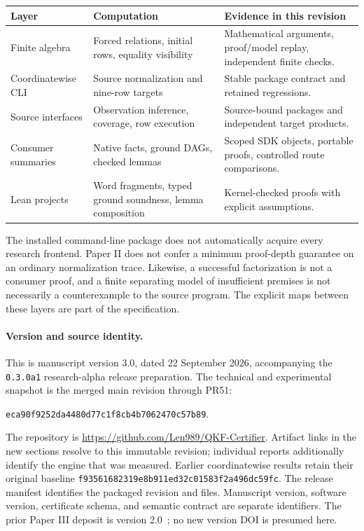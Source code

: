 \begin{center}\small
\begin{tabularx}{\textwidth}{@{}l>{\raggedright\arraybackslash}X>{\raggedright\arraybackslash}X@{}}
\toprule
Layer & Computation & Evidence in this revision\\
\midrule
Finite algebra & Forced relations, initial rows, equality visibility & Mathematical arguments, proof/model replay, independent finite checks.\\
Coordinatewise CLI & Source normalization and nine-row targets & Stable package contract and retained regressions.\\
Source interfaces & Observation inference, coverage, row execution & Source-bound packages and independent target products.\\
Consumer summaries & Native facts, ground DAGs, checked lemmas & Scoped SDK objects, portable proofs, controlled route comparisons.\\
Lean projects & Word fragments, typed ground soundness, lemma composition & Kernel-checked proofs with explicit assumptions.\\
\bottomrule
\end{tabularx}
\end{center}

The installed command-line package does not automatically acquire every research frontend. Paper II does not confer a minimum proof-depth guarantee on an ordinary normalization trace. Likewise, a successful factorization is not a consumer proof, and a finite separating model of insufficient premises is not necessarily a counterexample to the source program. The explicit maps between these layers are part of the specification.

\paragraph{Version and source identity.}
This is manuscript version 3.0, dated 22 September 2026, accompanying the \texttt{0.3.0a1} research-alpha release preparation. The technical and experimental snapshot is the merged main revision through PR51:
\begin{center}\small\texttt{eca90f9252da4480d77c1f8cb4b7062470c57b89}.\end{center}
The repository is \url{https://github.com/Len989/QKF-Certifier}. Artifact links in the new sections resolve to this immutable revision; individual reports additionally identify the engine that was measured. Earlier coordinatewise results retain their original baseline \texttt{f93561682319e8b911ed32c01583f2a496dc59fc}. The release manifest identifies the packaged revision and files. Manuscript version, software version, certificate schema, and semantic contract are separate identifiers. The prior Paper III deposit is version 2.0~\cite{QKFPaperIIIv2}; no new version DOI is presumed here.

